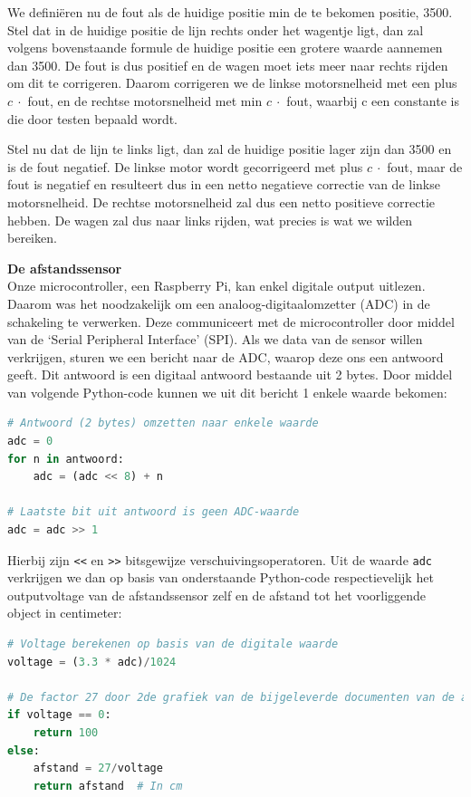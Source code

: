 \documentclass[a4paper,kulak]{kulakarticle}
\begin{document}
We definiëren nu de fout als de huidige positie min de te bekomen positie, 3500. Stel dat in de huidige positie de lijn rechts onder het wagentje ligt, dan zal volgens bovenstaande formule de huidige positie een grotere waarde aannemen dan 3500. De fout is dus positief en de wagen moet iets meer naar rechts rijden om dit te corrigeren. Daarom corrigeren we de linkse motorsnelheid met een plus $c \ \cdot$ fout, en de rechtse motorsnelheid met min $c \ \cdot$ fout, waarbij c een constante is die door testen bepaald wordt. 

Stel nu dat de lijn te links ligt, dan zal de huidige positie lager zijn dan 3500 en is de fout negatief. De linkse motor wordt gecorrigeerd met plus $c \  \cdot$ fout, maar de fout is negatief en resulteert dus in een netto negatieve correctie van de linkse motorsnelheid. De rechtse motorsnelheid zal dus een netto positieve correctie hebben. De wagen zal dus naar links rijden, wat precies is wat we wilden bereiken.

\textbf{\large De afstandssensor}\\
Onze microcontroller, een Raspberry Pi, kan enkel digitale output uitlezen. Daarom was het noodzakelijk om een analoog-digitaalomzetter (ADC) in de schakeling te verwerken. Deze communiceert met de microcontroller door middel van de `Serial Peripheral Interface' (SPI). Als we data van de sensor willen verkrijgen, sturen we een bericht naar de ADC, waarop deze ons een antwoord geeft. Dit antwoord is een digitaal antwoord bestaande uit 2 bytes. Door middel van volgende Python-code kunnen we uit dit bericht 1 enkele waarde bekomen:
\begin{lstlisting}[language=Python]
# Antwoord (2 bytes) omzetten naar enkele waarde
adc = 0
for n in antwoord:
	adc = (adc << 8) + n	

# Laatste bit uit antwoord is geen ADC-waarde
adc = adc >> 1
\end{lstlisting}

Hierbij zijn \texttt{<<} en \texttt{>>} bitsgewijze verschuivingsoperatoren. Uit de waarde \texttt{adc} verkrijgen we dan op basis van onderstaande Python-code respectievelijk het outputvoltage van de afstandssensor zelf en de afstand tot het voorliggende object in centimeter:

\begin{lstlisting}[language=Python]
# Voltage berekenen op basis van de digitale waarde
voltage = (3.3 * adc)/1024
	
# De factor 27 door 2de grafiek van de bijgeleverde documenten van de afstandssensor te lineariseren. 
if voltage == 0:
	return 100
else:
	afstand = 27/voltage
	return afstand	# In cm
\end{lstlisting}
\end{document}
